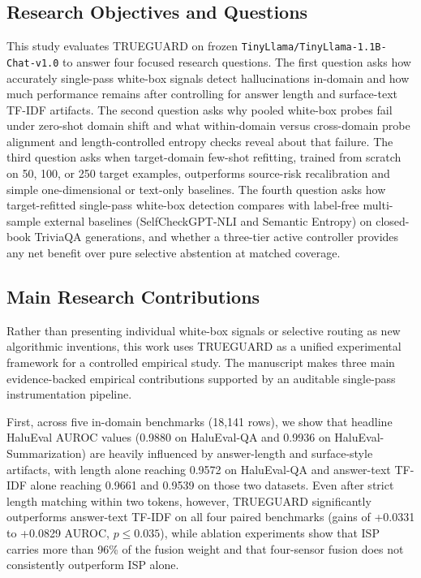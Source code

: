\documentclass{ieeeaccess}
\begin{document}
\subsection{Research Objectives and Questions}
This study evaluates TRUEGUARD on frozen \texttt{TinyLlama/TinyLlama-1.1B-Chat-v1.0} to answer four focused research questions. The first question asks how accurately single-pass white-box signals detect hallucinations in-domain and how much performance remains after controlling for answer length and surface-text TF-IDF artifacts. The second question asks why pooled white-box probes fail under zero-shot domain shift and what within-domain versus cross-domain probe alignment and length-controlled entropy checks reveal about that failure. The third question asks when target-domain few-shot refitting, trained from scratch on 50, 100, or 250 target examples, outperforms source-risk recalibration and simple one-dimensional or text-only baselines. The fourth question asks how target-refitted single-pass white-box detection compares with label-free multi-sample external baselines (SelfCheckGPT-NLI and Semantic Entropy) on closed-book TriviaQA generations, and whether a three-tier active controller provides any net benefit over pure selective abstention at matched coverage.

\subsection{Main Research Contributions}
Rather than presenting individual white-box signals or selective routing as new algorithmic inventions, this work uses TRUEGUARD as a unified experimental framework for a controlled empirical study. The manuscript makes three main evidence-backed empirical contributions supported by an auditable single-pass instrumentation pipeline.

First, across five in-domain benchmarks (18,141 rows), we show that headline HaluEval AUROC values (0.9880 on HaluEval-QA and 0.9936 on HaluEval-Summarization) are heavily influenced by answer-length and surface-style artifacts, with length alone reaching 0.9572 on HaluEval-QA and answer-text TF-IDF alone reaching 0.9661 and 0.9539 on those two datasets. Even after strict length matching within two tokens, however, TRUEGUARD significantly outperforms answer-text TF-IDF on all four paired benchmarks (gains of +0.0331 to +0.0829 AUROC, $p \le 0.035$), while ablation experiments show that ISP carries more than 96\% of the fusion weight and that four-sensor fusion does not consistently outperform ISP alone.
\end{document}
